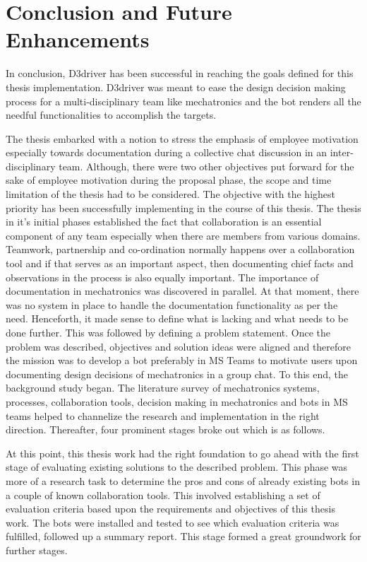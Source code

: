 \chapter{Conclusion and Future Enhancements}
\label{chap: cafe}

In conclusion, D3driver has been successful in reaching the goals defined for this thesis implementation. D3driver was meant to ease the design decision making process for a multi-disciplinary team like mechatronics and the bot renders all the needful functionalities to accomplish the targets. 

The thesis embarked with a notion to stress the emphasis of employee motivation especially towards documentation during a collective chat discussion in an inter-disciplinary team. Although, there were two other objectives put forward for the sake of employee motivation during the proposal phase, the scope and time limitation of the thesis had to be considered. The objective with the highest priority has been successfully implementing in the course of this thesis. The thesis in it's initial phases established the fact that collaboration is an essential component of any team especially when there are members from various domains. Teamwork, partnership and co-ordination normally happens over a collaboration tool and if that serves as an important aspect, then documenting chief facts and observations in the process is also equally important. The importance of documentation in mechatronics was discovered in parallel. At that moment, there was no system in place to handle the documentation functionality as per the need. Henceforth, it made sense to define what is lacking and what needs to be done further. This was followed by defining a problem statement. Once the problem was described, objectives and solution ideas were aligned and therefore the mission was to develop a bot preferably in MS Teams to motivate users upon documenting design decisions of mechatronics in a group chat. To this end, the background study began. The literature survey of mechatronics systems, processes, collaboration tools, decision making in mechatronics and bots in MS teams helped to channelize the research and implementation in the right direction. Thereafter, four prominent stages broke out which is as follows. 


At this point, this thesis work had the right foundation to go ahead with the first stage of evaluating existing solutions to the described problem. This phase was more of a research task to determine the pros and cons of already existing bots in a couple of known collaboration tools. This involved establishing a set of evaluation criteria based upon the requirements and objectives of this thesis work. The bots were installed and tested to see which evaluation criteria was fulfilled, followed up a summary report. This stage formed a great groundwork for further stages.  

